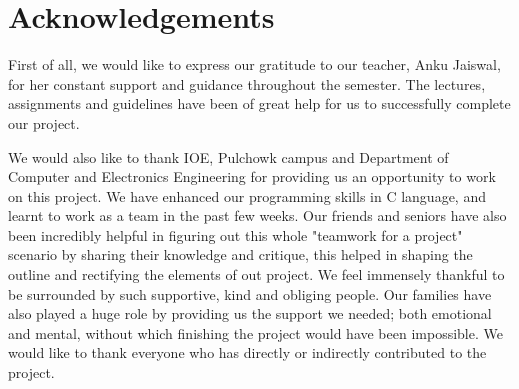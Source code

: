 \documentclass[report]{subfiles}
\begin{document}
\chapter*{\centering Acknowledgements}

First of all, we would like to express our gratitude to our teacher, Anku Jaiswal, for her constant support and guidance throughout the semester.
The lectures, assignments and guidelines have been of great help for us to successfully complete our project.

We would also like to thank IOE, Pulchowk campus and Department of Computer and Electronics Engineering for providing us an opportunity to work on this project.
We have enhanced our programming skills in C language, and learnt to work as a team in the past few weeks. Our friends and seniors have also been incredibly helpful in figuring out this whole "teamwork for a project" scenario by sharing their knowledge and critique, this helped in shaping the outline and rectifying the elements of out project. 
We feel immensely thankful to be surrounded by such supportive, kind and obliging people. Our families have also played a huge role by providing us the support we needed; both emotional and mental, without which finishing the project would have been impossible.
We would like to thank everyone who has directly or indirectly contributed to the project.
\end{document}
